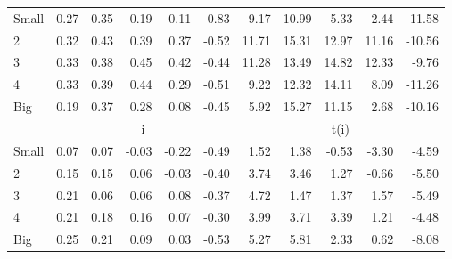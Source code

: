 \begin{table}[!ht]
\begin{tabular}{lrrrrrrrrrr}
    \\
      \cmidrule(r){2-6} \cmidrule(r){7-11}

    Small   & 0.27  & 0.35  & 0.19  & -0.11  & -0.83  & 9.17  & 10.99  & 5.33  & -2.44  & -11.58  \\
         2  & 0.32  & 0.43  & 0.39  & 0.37  & -0.52  & 11.71  & 15.31  & 12.97  & 11.16  & -10.56  \\
         3  & 0.33  & 0.38  & 0.45  & 0.42  & -0.44  & 11.28  & 13.49  & 14.82  & 12.33  & -9.76  \\
         4  & 0.33  & 0.39  & 0.44  & 0.29  & -0.51  & 9.22  & 12.32  & 14.11  & 8.09  & -11.26  \\
    Big     & 0.19  & 0.37  & 0.28  & 0.08  & -0.45  & 5.92  & 15.27  & 11.15  & 2.68  & -10.16  \\

  
    
      & \multicolumn{5}{c}{i} & \multicolumn{5}{c}{t(i)}
    
    \\
      \cmidrule(r){2-6} \cmidrule(r){7-11}

    Small   & 0.07  & 0.07  & -0.03  & -0.22  & -0.49  & 1.52  & 1.38  & -0.53  & -3.30  & -4.59  \\
         2  & 0.15  & 0.15  & 0.06  & -0.03  & -0.40  & 3.74  & 3.46  & 1.27  & -0.66  & -5.50  \\
         3  & 0.21  & 0.06  & 0.06  & 0.08  & -0.37  & 4.72  & 1.47  & 1.37  & 1.57  & -5.49  \\
         4  & 0.21  & 0.18  & 0.16  & 0.07  & -0.30  & 3.99  & 3.71  & 3.39  & 1.21  & -4.48  \\
    Big     & 0.25  & 0.21  & 0.09  & 0.03  & -0.53  & 5.27  & 5.81  & 2.33  & 0.62  & -8.08  \\

  

  \bottomrule
\end{tabular}
\label{tbl:25_Size_Var_FF2015}
\end{table}